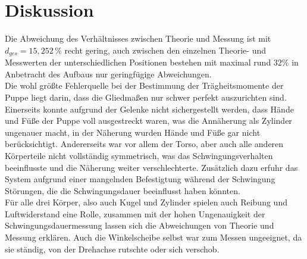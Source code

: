 \section{Diskussion}
\label{sec:Diskussion}

Die Abweichung des Verhältnisses zwischen Theorie und Messung ist mit $d_{ges} = 15,252 \,\%$ recht gering, 
auch zwischen den einzelnen Theorie- und Messwerten der unterschiedlichen Positionen bestehen mit maximal rund $32 \%$ in Anbetracht des Aufbaus nur geringfügige Abweichungen. \\

Die wohl größte Fehlerquelle bei der Bestimmung der Trägheitsmomente der Puppe liegt darin, dass die Gliedmaßen nur schwer perfekt auszurichten sind. 
Einerseits konnte aufgrund der Gelenke nicht sichergestellt werden, dass Hände und Füße der Puppe voll ausgestreckt waren, was die Annäherung als Zylinder ungenauer macht, 
in der Näherung wurden Hände und Füße gar nicht berücksichtigt.
Andererseits war vor allem der Torso, aber auch alle anderen Körperteile nicht vollständig symmetrisch, was das Schwingungsverhalten beeinflusste und die Näherung weiter verschlechterte.
Zusätzlich dazu erfuhr das System aufgrund einer mangelnden Befestigtung während der Schwingung Störungen, die die Schwingungsdauer beeinflusst haben könnten. \\

Für alle drei Körper, also auch Kugel und Zylinder spielen auch Reibung und Luftwiderstand eine Rolle, zusammen mit der hohen Ungenauigkeit der Schwingungsdauermessung 
lassen sich die Abweichungen von Theorie und Messung erklären.
Auch die Winkelscheibe selbst war zum Messen ungeeignet, da sie ständig, von der Drehachse rutschte oder sich verschob.